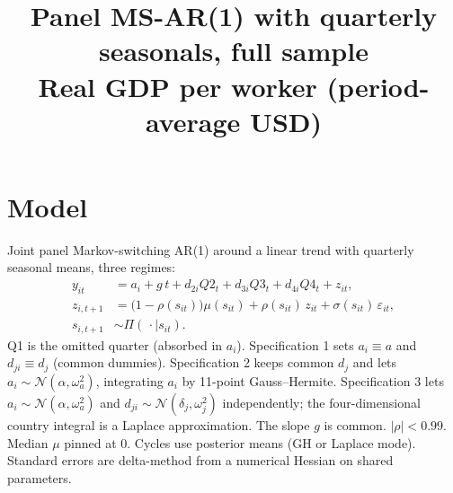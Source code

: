\documentclass[11pt]{article}
\title{Panel MS-AR(1) with quarterly seasonals, full sample\\[0.4em]\large Real GDP per worker (period-average USD)}
\author{}
\date{}
\begin{document}
\maketitle
\section{Model}
Joint panel Markov-switching AR(1) around a linear trend with quarterly seasonal means, three regimes:
\begin{align}
y_{it} &= a_i + g\, t + d_{2i} Q2_t + d_{3i} Q3_t + d_{4i} Q4_t + z_{it}, \\
z_{i,t+1} &= \bigl(1-\rho(s_{it})\bigr)\mu(s_{it}) + \rho(s_{it})\, z_{it} + \sigma(s_{it})\,\varepsilon_{it}, \\
s_{i,t+1} &\sim \Pi(\,\cdot\mid s_{it}).
\end{align}
Q1 is the omitted quarter (absorbed in $a_i$). Specification 1 sets $a_i\equiv a$ and $d_{ji}\equiv d_j$ (common dummies). Specification 2 keeps common $d_j$ and lets $a_i\sim\mathcal{N}(\alpha,\omega_a^2)$, integrating $a_i$ by 11-point Gauss--Hermite. Specification 3 lets $a_i\sim\mathcal{N}(\alpha,\omega_a^2)$ and $d_{ji}\sim\mathcal{N}(\delta_j,\omega_j^2)$ independently; the four-dimensional country integral is a Laplace approximation. The slope $g$ is common. $|\rho|<0.99$. Median $\mu$ pinned at 0. Cycles use posterior means (GH or Laplace mode). Standard errors are delta-method from a numerical Hessian on shared parameters.
\clearpage
\end{document}
